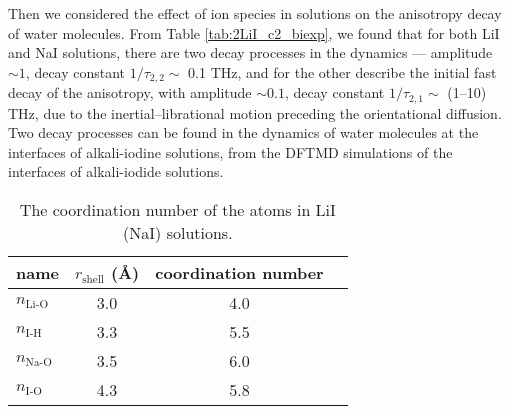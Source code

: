 Then we considered the effect of ion species in solutions on the anisotropy decay of water molecules.
From Table \ref{tab:2LiI_c2_biexp}, we found that for both LiI and NaI solutions, there are two decay processes in the dynamics --- amplitude $\sim 1$,
decay constant $1/\tau_{2,2}\sim$ 0.1 THz, and for the other describe the initial fast decay 
of the anisotropy, with amplitude $\sim 0.1$, decay constant $1/\tau_{2,1}\sim$ (1--10) THz, 
due to the inertial--librational motion preceding the orientational diffusion.
Two decay processes can be found in the dynamics of water molecules 
at the interfaces of alkali-iodine solutions, from the DFTMD simulations of the interfaces of alkali-iodide solutions.
%
\begin{table}[H] %
\centering
\caption{\label{tab:table_CoordNo}%
The coordination number of the atoms in LiI (NaI) solutions.}
\begin{tabular}{lccc}
name & $r_\text{shell}$ (\AA) & coordination number \\
\hline
$n_\text{Li-O}$ & 3.0 & 4.0 \\
$n_\text{I-H}$ & 3.3 & 5.5 \\
$n_\text{Na-O}$ & 3.5 & 6.0 \\ 
$n_\text{I-O}$ & 4.3 & 5.8 \\
\end{tabular}
\end{table}


